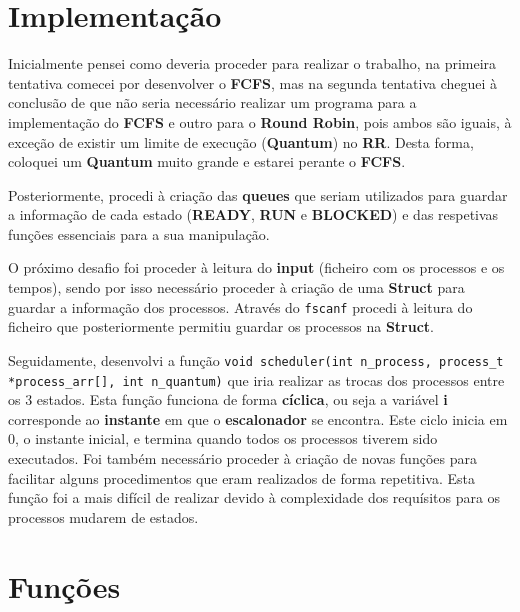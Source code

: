 \documentclass[11pt]{article}   %
\begin{document}
\section{Implementação}

\hspace{0,5cm}Inicialmente pensei como deveria proceder para realizar o trabalho, na primeira tentativa comecei por desenvolver o \textbf{FCFS}, mas na segunda tentativa cheguei à conclusão de que não seria necessário realizar um programa para a implementação do \textbf{FCFS} e outro para o \textbf{Round Robin}, pois ambos são iguais, à exceção de existir um limite de execução (\textbf{Quantum}) no \textbf{RR}.
Desta forma, coloquei um \textbf{Quantum} muito grande e estarei perante o \textbf{FCFS}. \par
Posteriormente, procedi à criação das \textbf{queues} que seriam utilizados para guardar a informação de cada estado (\textbf{READY}, \textbf{RUN} e \textbf{BLOCKED}) e das respetivas funções essenciais para a sua manipulação. \par
O próximo desafio foi proceder à leitura do \textbf{input} (ficheiro com os processos e os tempos), sendo por isso necessário proceder à criação de uma \textbf{Struct} para guardar a informação dos processos.
Através do \verb|fscanf| procedi à leitura do ficheiro que posteriormente permitiu guardar os processos na \textbf{Struct}. \par
Seguidamente, desenvolvi a função \newline
\verb|void scheduler(int n_process, process_t *process_arr[], int n_quantum)| que iria realizar as trocas dos processos entre os 3 estados. 
Esta função funciona de forma \textbf{cíclica}, ou seja a variável \textbf{i} corresponde ao \textbf{instante} em que o \textbf{escalonador} se encontra.
Este ciclo inicia em 0, o instante inicial, e termina quando todos os processos tiverem sido executados.
Foi também necessário proceder à criação de novas funções para facilitar alguns procedimentos que eram realizados de forma repetitiva.
Esta função foi a mais difícil de realizar devido à complexidade dos requísitos para os processos mudarem de estados. 
\section{Funções}
    
\end{document}
